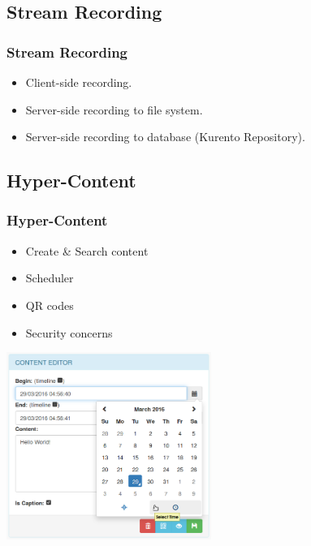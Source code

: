 \documentclass[compress]{beamer}
\begin{document}
\subsection{Stream Recording}
\begin{frame}[c]
\centering
		\frametitle{Stream Recording}

		\begin{itemize}
\item Client-side recording.
		\vfill

\item Server-side recording to file system.
		\vfill

\item Server-side recording to database (Kurento Repository).
		\end{itemize}
	\end{frame}


\subsection{Hyper-Content}

		\begin{frame}[c]
		\frametitle{Hyper-Content}


		\begin{itemize}
		\item Create \& Search content
				\vfill
\item Scheduler
		\vfill
		\item QR codes
		\vfill
		\item Security concerns
		\end{itemize}

		\begin{flushright}

			\vspace*{-11\baselineskip}
			\includegraphics[width=0.5\textwidth]{figures/edition.png}
		\end{flushright}
		

		\end{frame}
\end{document}
